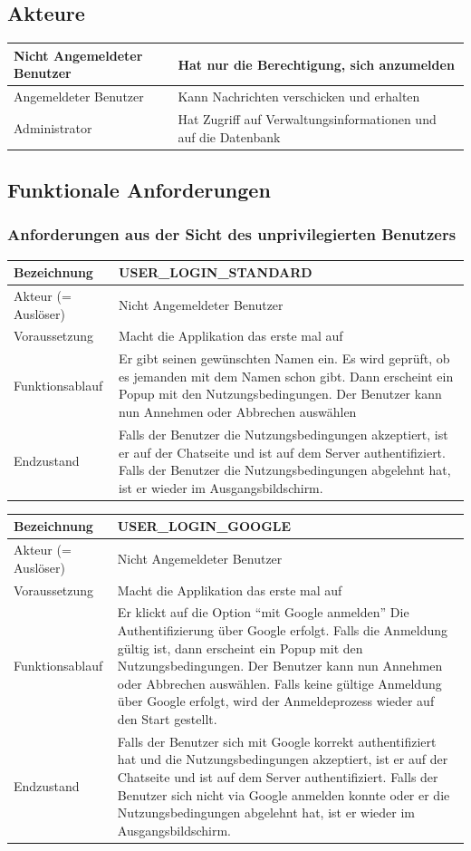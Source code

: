 \documentclass[12pt]{article}
\newcommand{\requirementTable}[5]{
    \begin{table}[H]
      \begin{tabularx}{\textwidth}{|l|X|}
        \hline
        Bezeichnung & #1  \\ \hline
        Akteur (= Auslöser) & #2  \\ \hline
        Voraussetzung & #3  \\ \hline
        Funktionsablauf & #4  \\ \hline
        Endzustand & #5  \\ \hline
      \end{tabularx}
    \end{table}
}
\begin{document}
    \subsection{Akteure}
        \begin{table}[H]
          \begin{tabularx}{\textwidth}{|l|X|}
            \hline
            Nicht Angemeldeter Benutzer & Hat nur die Berechtigung, sich anzumelden  \\ \hline
            Angemeldeter Benutzer & Kann Nachrichten verschicken und erhalten  \\ \hline
            Administrator & Hat Zugriff auf Verwaltungsinformationen und auf die Datenbank \\ \hline
          \end{tabularx}
        \end{table}


    \subsection{Funktionale Anforderungen}
      \subsubsection{Anforderungen aus der Sicht des unprivilegierten Benutzers}
        \requirementTable
            {USER\_LOGIN\_STANDARD}
            {Nicht Angemeldeter Benutzer}
            {Macht die Applikation das erste mal auf}
            {
            Er gibt seinen gewünschten Namen ein. \newline
            Es wird geprüft, ob es jemanden mit dem Namen schon gibt. \newline
            Dann erscheint ein Popup mit den Nutzungsbedingungen. Der Benutzer kann nun Annehmen oder Abbrechen auswählen
            }
            {
            Falls der Benutzer die Nutzungsbedingungen akzeptiert, ist er auf der Chatseite und ist auf dem Server authentifiziert. Falls der Benutzer die Nutzungsbedingungen abgelehnt hat, ist er wieder im Ausgangsbildschirm.
            }

        \requirementTable
            {USER\_LOGIN\_GOOGLE}
            {Nicht Angemeldeter Benutzer}
            {Macht die Applikation das erste mal auf}
            {
            Er klickt auf die Option “mit Google anmelden” \newline
            Die Authentifizierung über Google erfolgt. \newline
            Falls die Anmeldung gültig ist, dann erscheint ein Popup mit den Nutzungsbedingungen. Der Benutzer kann nun Annehmen oder Abbrechen auswählen. \newline
            Falls keine gültige Anmeldung über Google erfolgt, wird der Anmeldeprozess wieder auf den Start gestellt.
            }
            {
            Falls der Benutzer sich mit Google korrekt authentifiziert hat und  die Nutzungsbedingungen akzeptiert, ist er auf der Chatseite und ist auf dem Server authentifiziert. \newline
            Falls der Benutzer sich nicht via Google anmelden konnte oder er die Nutzungsbedingungen abgelehnt hat, ist er wieder im Ausgangsbildschirm.
            }
\end{document}
